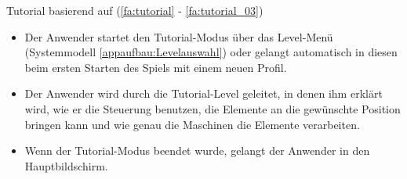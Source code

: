 \documentclass{scrartcl}
\begin{document}
\begin{telist}
	\item Tutorial basierend auf (\ref{fa:tutorial} - \ref{fa:tutorial_03})
	\begin{itemize}
		\item Der Anwender startet den Tutorial-Modus über das Level-Menü (Systemmodell \ref{appaufbau:Levelauswahl}) oder gelangt automatisch in diesen beim ersten Starten des Spiels mit einem neuen Profil.
		\item Der Anwender wird durch die Tutorial-Level geleitet, in denen ihm erklärt wird, wie er die Steuerung benutzen, die Elemente an die gewünschte Position bringen kann und wie genau die Maschinen die Elemente verarbeiten.
		\item Wenn der Tutorial-Modus beendet wurde, gelangt der Anwender in den Hauptbildschirm.
	\end{itemize}


\end{telist}
\end{document}
